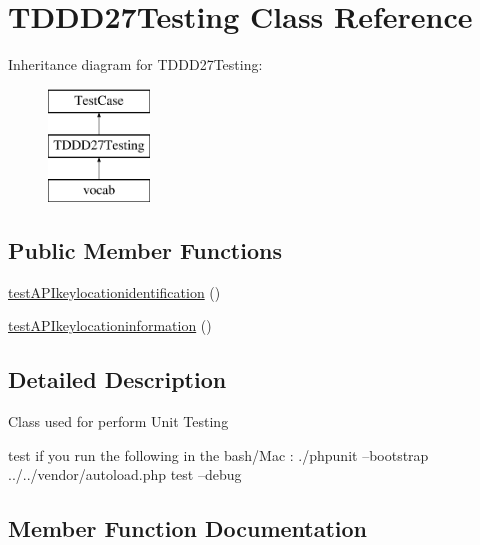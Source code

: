 \hypertarget{class_t_d_d_d27_testing}{}\section{T\+D\+D\+D27\+Testing Class Reference}
\label{class_t_d_d_d27_testing}
Inheritance diagram for T\+D\+D\+D27\+Testing\+:\begin{figure}[H]
\begin{center}
\leavevmode
\includegraphics[height=3.000000cm]{class_t_d_d_d27_testing}
\end{center}
\end{figure}
\subsection*{Public Member Functions}
\begin{DoxyCompactItemize}
\item 
\mbox{\hyperlink{class_t_d_d_d27_testing_ae83d30c3504bfedb0c0d95ae76250b59}{test\+A\+P\+Ikeylocationidentification}} ()
\item 
\mbox{\hyperlink{class_t_d_d_d27_testing_ab0a2313acbb42c73e5b9f1f217f708a2}{test\+A\+P\+Ikeylocationinformation}} ()
\end{DoxyCompactItemize}


\subsection{Detailed Description}
Class used for perform Unit Testing

test if you run the following in the bash/\+Mac \+: ./phpunit --bootstrap ../../vendor/autoload.php test --debug 

\subsection{Member Function Documentation}
\mbox{\label{class_t_d_d_d27_testing_ae83d30c3504bfedb0c0d95ae76250b59}} 
